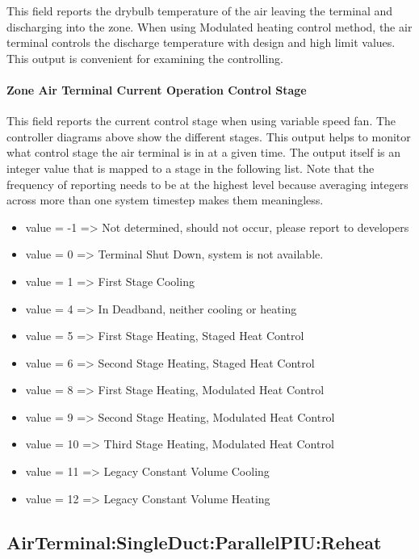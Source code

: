This field reports the drybulb temperature of the air leaving the terminal and discharging into the zone.  When using Modulated heating control method, the air terminal controls the discharge temperature with design and high limit values.  This output is convenient for examining the controlling. 

\paragraph{Zone Air Terminal Current Operation Control Stage}

This field reports the current control stage when using variable speed fan.  The controller diagrams above show the different stages.  This output helps to monitor what control stage the air terminal is in at a given time.  The output itself is an integer value that is mapped to a stage in the following list.  Note that the frequency of reporting needs to be at the highest level because averaging integers across more than one system timestep makes them meaningless. 

\begin{itemize}
\item
  value = -1  => Not determined, should not occur, please report to developers  
\item
  value = 0 => Terminal Shut Down, system is not available. 
\item
  value = 1 => First Stage Cooling
\item
  value = 4 => In Deadband, neither cooling or heating
\item
  value = 5 => First Stage Heating, Staged Heat Control
\item
  value = 6 => Second Stage Heating, Staged Heat Control
\item
  value = 8 => First Stage Heating, Modulated Heat Control
\item
  value = 9 => Second Stage Heating, Modulated Heat Control
\item
  value = 10 => Third Stage Heating, Modulated Heat Control
\item
  value = 11 => Legacy Constant Volume Cooling
\item 
  value = 12 => Legacy Constant Volume Heating
\end{itemize}

\subsection{AirTerminal:SingleDuct:ParallelPIU:Reheat}\label{airterminalsingleductparallelpiureheat}

